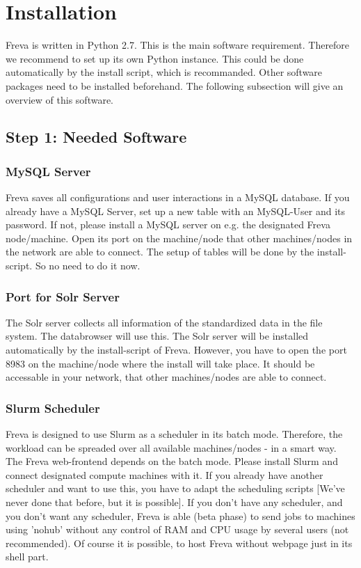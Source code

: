 \documentclass[a4paper,11pt]{ltxdoc}
\begin{document}
\section{Installation}
Freva is written in Python 2.7. This is the main software requirement. Therefore we recommend to set up its own Python instance. This could be done automatically by the install script, which is recommanded. Other software packages need to be installed beforehand. The following subsection will give an overview of this software.   

\subsection{Step 1: Needed Software}
\subsubsection{MySQL Server}
Freva saves all configurations and user interactions in a MySQL database. If you already have a MySQL Server, set up a new table with an MySQL-User and its password. If not, please install a MySQL server on e.g. the designated Freva node/machine. Open its port on the machine/node that other machines/nodes in the network are able to connect. The setup of tables will be done by the install-script. So no need to do it now.
\subsubsection{Port for Solr Server}
The Solr server collects all information of the standardized data in the file system. The databrowser will use this. The Solr server will be installed automatically by the install-script of Freva. However, you have to open the port 8983 on the machine/node where the install will take place. It should be accessable in your network, that other machines/nodes are able to connect.
\subsubsection{Slurm Scheduler}
Freva is designed to use Slurm as a scheduler in its batch mode. Therefore, the workload can be spreaded over all available machines/nodes - in a smart way. The Freva web-frontend depends on the batch mode. Please install Slurm and connect designated compute machines with it. If you already have another scheduler and want to use this, you have to adapt the scheduling scripts [We've never done that before, but it is possible]. If you don't have any scheduler, and you don't want any scheduler, Freva is able (beta phase) to send jobs to machines using 'nohub' without any control of RAM and CPU usage by several users (not recommended). Of course it is possible, to host Freva without webpage just in its shell part.
\end{document}
